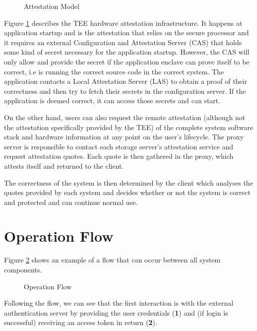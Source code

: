 \begin{figure}[htbp]
  \caption{Attestation Model}
  \label{fig:attestation_model}
\end{figure}

Figure \ref{fig:attestation_model} describes the \gls{TEE} hardware attestation infrastructure. It happens at application startup and is the attestation that relies on the secure processor and it requires an external Configuration and Attestation Server (\gls{CAS}) that holds some kind of secret necessary for the application startup. However, the \gls{CAS} will only allow and provide the secret if the application enclave can prove itself to be correct, i.e is running the correct source code in the correct system. The application contacts a Local Attestation Server (\gls{LAS}) to obtain a proof of their correctness and then try to fetch their secrets in the configuration server. If the application is deemed correct, it can access those secrets and can start.

On the other hand, users can also request the remote attestation (although not the attestation specifically provided by the \gls{TEE}) of the complete system software stack and hardware information at any point on the user's lifecycle. The proxy server is responsible to contact each storage server's attestation service and request attestation quotes. Each quote is then gathered in the proxy, which attests itself and returned to the client.

The correctness of the system is then determined by the client which analyses the quotes provided by each system and decides whether or not the system is correct and protected and can continue normal use.

\section{Operation Flow}
\label{sec:operation_flow}

Figure \ref{fig:operation_flow} shows an example of a flow that can occur between all system components.

\begin{figure}[htbp]
  \caption{Operation Flow}
  \label{fig:operation_flow}
\end{figure}

Following the flow, we can see that the first interaction is with the external authentication server by providing the user credentials (\textbf{1}) and (if login is successful) receiving an access token in return (\textbf{2}). 

